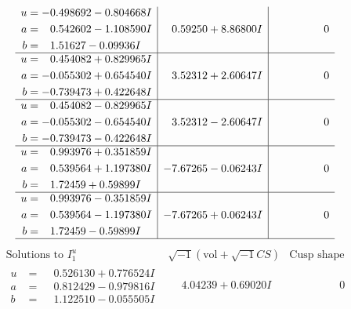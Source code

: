 \documentclass[1p]{elsarticle_modified}
\theoremstyle{definition}
\newcommand{\I}{\sqrt{-1}}
\begin{document}
$$\begin{array}{c|c|c}
\begin{aligned}
u &= -0.498692 - 0.804668 I \\
a &= \phantom{-}0.542602 - 1.108590 I \\
b &= \phantom{-}1.51627 - 0.09936 I\end{aligned}
 & \phantom{-}0.59250 + 8.86800 I & \phantom{-0.000000 } 0 \\ \hline\begin{aligned}
u &= \phantom{-}0.454082 + 0.829965 I \\
a &= -0.055302 + 0.654540 I \\
b &= -0.739473 + 0.422648 I\end{aligned}
 & \phantom{-}3.52312 + 2.60647 I & \phantom{-0.000000 } 0 \\ \hline\begin{aligned}
u &= \phantom{-}0.454082 - 0.829965 I \\
a &= -0.055302 - 0.654540 I \\
b &= -0.739473 - 0.422648 I\end{aligned}
 & \phantom{-}3.52312 - 2.60647 I & \phantom{-0.000000 } 0 \\ \hline\begin{aligned}
u &= \phantom{-}0.993976 + 0.351859 I \\
a &= \phantom{-}0.539564 + 1.197380 I \\
b &= \phantom{-}1.72459 + 0.59899 I\end{aligned}
 & -7.67265 - 0.06243 I & \phantom{-0.000000 } 0 \\ \hline\begin{aligned}
u &= \phantom{-}0.993976 - 0.351859 I \\
a &= \phantom{-}0.539564 - 1.197380 I \\
b &= \phantom{-}1.72459 - 0.59899 I\end{aligned}
 & -7.67265 + 0.06243 I & \phantom{-0.000000 } 0\\
 \hline 
 \end{array}$$\newpage$$\begin{array}{c|c|c}  
\text{Solutions to }I^u_{1}& \I (\text{vol} + \sqrt{-1}CS) & \text{Cusp shape}\\
 \hline 
\begin{aligned}
u &= \phantom{-}0.526130 + 0.776524 I \\
a &= \phantom{-}0.812429 - 0.979816 I \\
b &= \phantom{-}1.122510 - 0.055505 I\end{aligned}
 & \phantom{-}4.04239 + 0.69020 I & \phantom{-0.000000 } 0 \\ \hline\begin{aligned}

\end{aligned}
\end{array}$$
\end{document}
